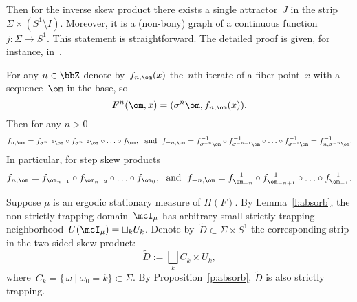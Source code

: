 \documentclass[a4paper,12pt]{amsart}
\begin{document}
Then for the inverse skew product there exists a single attractor~$J$ in the strip~$\Sigma \times (S^1 \setminus I)$. Moreover, it is a (non-bony) graph of a continuous function~$j \colon \Sigma \to S^1$. This statement is straightforward. The detailed proof is given, for instance, in~\cite[Props.~2, 3]{Ilyashenko2010}.

For any $n \in \bbZ$ denote by~$f_{n,\om} (x)$ the~$n$th iterate of a fiber point~$x$ with a sequence~$\om$ in the base, so
\begin{equation}    \label{e:n_image}
F^n(\om,x) = (\sigma^n \om, f_{n,\om} (x)).
\end{equation}
Then for any $n > 0$
$$
f_{n,\om} = f_{\sigma^{n-1}\om} \circ f_{\sigma^{n-2}\om} \circ \ldots \circ f_{\om},\;\text{ and }\;
f_{-n,\om} = f_{\sigma^{-n}\om}^{-1} \circ f_{\sigma^{-n+1}\om}^{-1} \circ \ldots \circ f_{\sigma^{-1}\om}^{-1} = f^{-1}_{n,\sigma^{-n}\om}.
$$
In particular, for step skew products
$$
f_{n,\om} = f_{\om_{n-1}} \circ f_{\om_{n-2}} \circ \ldots \circ f_{\om_0},\;\text{ and }\;
f_{-n,\om} = f_{\om_{-n}}^{-1} \circ f_{\om_{-n+1}}^{-1} \circ \ldots \circ f_{\om_{-1}}^{-1}.
$$

Suppose $\mu$ is an ergodic stationary measure of $\Pi(F)$. By Lemma~\ref{l:absorb}, the non-strictly trapping domain~$\mcI_\mu$ has arbitrary small strictly trapping neighborhood~$U(\mcI_\mu) = \sqcup_k U_k$. Denote by~$\tilde D \subset \Sigma \times S^1$ the corresponding strip in the two-sided skew product:
$$
\tilde D := \bigsqcup_k C_k \times U_k,
$$
where~$C_k = \{\, \omega \mid \omega_0 = k \} \subset \Sigma$. By Proposition~\ref{p:absorb}, $\tilde D$ is also strictly trapping.
\end{document}
